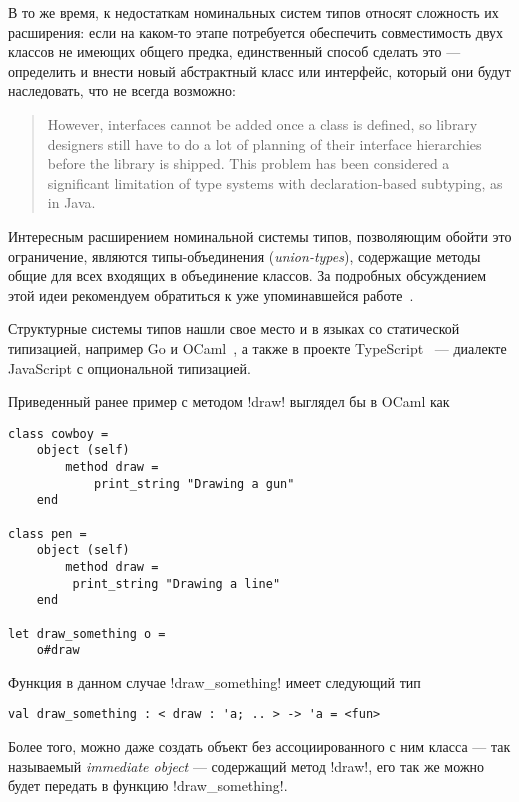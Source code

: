В то же время, к недостаткам номинальных систем типов относят сложность их
расширения: если на каком-то этапе потребуется обеспечить совместимость двух
классов не имеющих общего предка, единственный способ сделать это --- определить
и внести новый абстрактный класс или интерфейс, который они будут наследовать,
что не всегда возможно:

\begin{quote}
However, interfaces cannot be added once a class is defined, so library
designers still have to do a lot of planning of their interface hierarchies
before the library is shipped. This problem has been considered a significant
limitation of type systems with declaration-based subtyping, as in Java.
\end{quote}

Интересным расширением номинальной системы типов, позволяющим обойти это
ограничение, являются типы-объединения (\emph{union-types}), содержащие методы
общие для всех входящих в объединение классов. За подробных обсуждением этой
идеи рекомендуем обратиться к уже упоминавшейся работе~\cite[]{Igarashi2006}.

Структурные системы типов нашли свое место и в языках со статической
типизацией, например Go и OCaml~\cite[с.~33]{Ocaml}, а также в проекте
TypeScript~\cite[]{TypeScript} --- диалекте JavaScript с опциональной
типизацией. 

Приведенный ранее пример с методом !draw! выглядел бы в OCaml как

\begin{lstlisting}[language={[Objective]Caml}]
class cowboy =
    object (self)
        method draw =
            print_string "Drawing a gun"
    end

class pen = 
    object (self) 
        method draw =
         print_string "Drawing a line"
    end

let draw_something o =
    o#draw

\end{lstlisting}

Функция в данном случае !draw_something! имеет следующий тип

\begin{lstlisting}
val draw_something : < draw : 'a; .. > -> 'a = <fun>
\end{lstlisting}

Более того, можно даже создать объект без ассоциированного с ним класса --- так
называемый \emph{immediate object} --- содержащий метод !draw!, его так
же можно будет передать в функцию !draw_something!.

